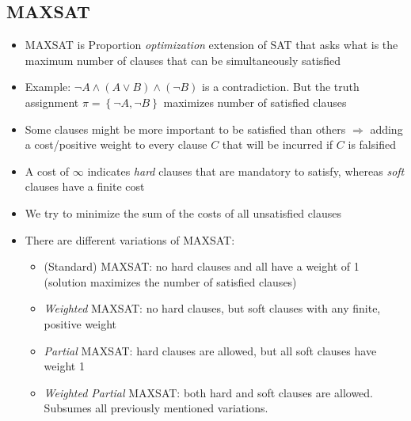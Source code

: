 \subsection{MAXSAT}
\begin{itemize}
	\item MAXSAT is Proportion \textit{optimization} extension of SAT that asks what is the maximum number of clauses that can be simultaneously satisfied
	\item Example: $\lnot A\wedge (A \vee B) \wedge (\lnot B)$ is a contradiction. But the truth assignment $\pi = \left\{\lnot A, \lnot B\right\}$ maximizes number of satisfied clauses
	\item Some clauses might be more important to be satisfied than others $\Rightarrow$ adding a cost/positive weight to every clause $C$ that will be incurred if $C$ is falsified
	\item A cost of $\infty$ indicates \textit{hard} clauses that are mandatory to satisfy, whereas \textit{soft} clauses have a finite cost
	\item We try to minimize the sum of the costs of all unsatisfied clauses
	\item There are different variations of MAXSAT:
	\begin{itemize}
		\item (Standard) MAXSAT: no hard clauses and all have a weight of 1 (solution maximizes the number of satisfied clauses)
		\item \textit{Weighted} MAXSAT: no hard clauses, but soft clauses with any finite, positive weight
		\item \textit{Partial} MAXSAT: hard clauses are allowed, but all soft clauses have weight 1
		\item \textit{Weighted Partial} MAXSAT: both hard and soft clauses are allowed. Subsumes all previously mentioned variations.
	\end{itemize}
\end{itemize}
